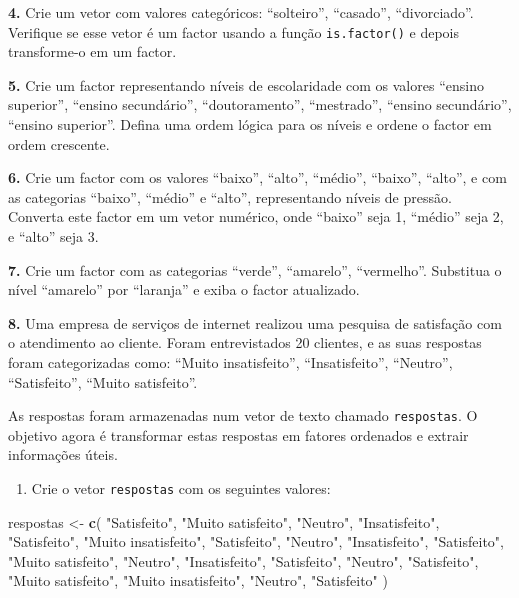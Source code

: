 \documentclass[
]{book}
\newenvironment{Shaded}{\begin{snugshade}}{\end{snugshade}}
\newcommand{\FunctionTok}[1]{\textcolor[rgb]{0.13,0.29,0.53}{\textbf{#1}}}
\newcommand{\NormalTok}[1]{#1}
\newcommand{\OtherTok}[1]{\textcolor[rgb]{0.56,0.35,0.01}{#1}}
\newcommand{\StringTok}[1]{\textcolor[rgb]{0.31,0.60,0.02}{#1}}
\providecommand{\tightlist}{%
  \setlength{\itemsep}{0pt}\setlength{\parskip}{0pt}}
\begin{document}
\textbf{4.} Crie um vetor com valores categóricos: ``solteiro'', ``casado'',
``divorciado''. Verifique se esse vetor é um factor usando a função
\texttt{is.factor()} e depois transforme-o em um factor.

\textbf{5.} Crie um factor representando níveis de escolaridade com os
valores ``ensino superior'', ``ensino secundário'', ``doutoramento'',
``mestrado'', ``ensino secundário'', ``ensino superior''. Defina uma ordem
lógica para os níveis e ordene o factor em ordem crescente.

\textbf{6.} Crie um factor com os valores ``baixo'', ``alto'', ``médio'', ``baixo'',
``alto'', e com as categorias ``baixo'', ``médio'' e ``alto'', representando
níveis de pressão. Converta este factor em um vetor numérico, onde
``baixo'' seja 1, ``médio'' seja 2, e ``alto'' seja 3.

\textbf{7.} Crie um factor com as categorias ``verde'', ``amarelo'', ``vermelho''.
Substitua o nível ``amarelo'' por ``laranja'' e exiba o factor atualizado.

\textbf{8.} Uma empresa de serviços de internet realizou uma pesquisa de satisfação com o atendimento ao cliente. Foram entrevistados 20 clientes, e as suas respostas foram categorizadas como: ``Muito insatisfeito'', ``Insatisfeito'', ``Neutro'', ``Satisfeito'', ``Muito satisfeito''.

As respostas foram armazenadas num vetor de texto chamado \texttt{respostas}. O objetivo agora é transformar estas respostas em fatores ordenados e extrair informações úteis.

\begin{enumerate}
\def\labelenumi{(\alph{enumi})}
\tightlist
\item
  Crie o vetor \texttt{respostas} com os seguintes valores:
\end{enumerate}

\begin{Shaded}
\begin{Highlighting}[]
\NormalTok{respostas }\OtherTok{\textless{}{-}} \FunctionTok{c}\NormalTok{(}
  \StringTok{"Satisfeito"}\NormalTok{, }\StringTok{"Muito satisfeito"}\NormalTok{, }\StringTok{"Neutro"}\NormalTok{, }\StringTok{"Insatisfeito"}\NormalTok{, }\StringTok{"Satisfeito"}\NormalTok{,}
  \StringTok{"Muito insatisfeito"}\NormalTok{, }\StringTok{"Satisfeito"}\NormalTok{, }\StringTok{"Neutro"}\NormalTok{, }\StringTok{"Insatisfeito"}\NormalTok{, }\StringTok{"Satisfeito"}\NormalTok{,}
  \StringTok{"Muito satisfeito"}\NormalTok{, }\StringTok{"Neutro"}\NormalTok{, }\StringTok{"Insatisfeito"}\NormalTok{, }\StringTok{"Satisfeito"}\NormalTok{, }\StringTok{"Neutro"}\NormalTok{,}
  \StringTok{"Satisfeito"}\NormalTok{, }\StringTok{"Muito satisfeito"}\NormalTok{, }\StringTok{"Muito insatisfeito"}\NormalTok{, }\StringTok{"Neutro"}\NormalTok{, }\StringTok{"Satisfeito"}
\NormalTok{)}
\end{Highlighting}
\end{Shaded}
\end{document}
